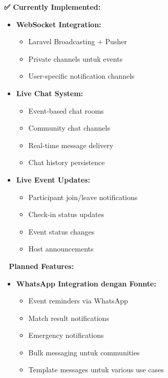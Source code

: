 \documentclass[12pt,a4paper]{article}
\begin{document}
\begin{implemented}
\textbf{✅ Currently Implemented:}
\begin{itemize}
    \item \textbf{WebSocket Integration:}
    \begin{itemize}
        \item Laravel Broadcasting + Pusher
        \item Private channels untuk events
        \item User-specific notification channels
    \end{itemize}
    \item \textbf{Live Chat System:}
    \begin{itemize}
        \item Event-based chat rooms
        \item Community chat channels
        \item Real-time message delivery
        \item Chat history persistence
    \end{itemize}
    \item \textbf{Live Event Updates:}
    \begin{itemize}
        \item Participant join/leave notifications
        \item Check-in status updates
        \item Event status changes
        \item Host announcements
    \end{itemize}
\end{itemize}
\end{implemented}

\begin{planned}
\textbf{🔄 Planned Features:}
\begin{itemize}
    \item \textbf{WhatsApp Integration dengan Fonnte:}
    \begin{itemize}
        \item Event reminders via WhatsApp
        \item Match result notifications
        \item Emergency notifications
        \item Bulk messaging untuk communities
        \item Template messages untuk various use cases
    \end{itemize}
\end{itemize}
\end{planned}
\end{document}
